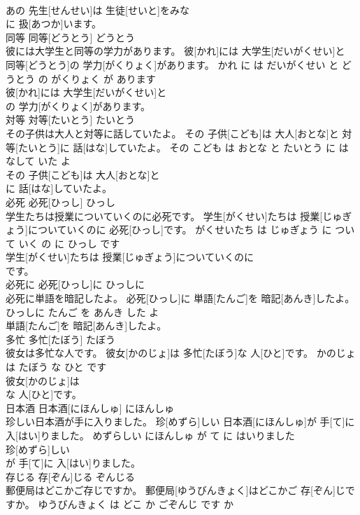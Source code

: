 \documentclass[8pt]{extreport}
\begin{document}
\begin{CJK}{UTF8}{min}
\\	あの 先生[せんせい]は 生徒[せいと]をみな
\\	に 扱[あつか]います。			
\\	同等	同等[どうとう]	どうとう	
\\	彼には大学生と同等の学力があります。	彼[かれ]には 大学生[だいがくせい]と 同等[どうとう]の 学力[がくりょく]があります。	かれ に は だいがくせい と どうとう の がくりょく が あります	
\\	彼[かれ]には 大学生[だいがくせい]と
\\	の 学力[がくりょく]があります。			
\\	対等	対等[たいとう]	たいとう	
\\	その子供は大人と対等に話していたよ。	その 子供[こども]は 大人[おとな]と 対等[たいとう]に 話[はな]していたよ。	その こども は おとな と たいとう に はなして いた よ	
\\	その 子供[こども]は 大人[おとな]と
\\	に 話[はな]していたよ。			
\\	必死	必死[ひっし]	ひっし	
\\	学生たちは授業についていくのに必死です。	学生[がくせい]たちは 授業[じゅぎょう]についていくのに 必死[ひっし]です。	がくせいたち は じゅぎょう に ついて いく の に ひっし です	
\\	学生[がくせい]たちは 授業[じゅぎょう]についていくのに
\\	です。			
\\	必死に	必死[ひっし]に	ひっしに	
\\	必死に単語を暗記したよ。	必死[ひっし]に 単語[たんご]を 暗記[あんき]したよ。	ひっしに たんご を あんき した よ	
\\	単語[たんご]を 暗記[あんき]したよ。			
\\	多忙	多忙[たぼう]	たぼう	
\\	彼女は多忙な人です。	彼女[かのじょ]は 多忙[たぼう]な 人[ひと]です。	かのじょ は たぼう な ひと です	
\\	彼女[かのじょ]は
\\	な 人[ひと]です。			
\\	日本酒	日本酒[にほんしゅ]	にほんしゅ	
\\	珍しい日本酒が手に入りました。	珍[めずら]しい 日本酒[にほんしゅ]が 手[て]に 入[はい]りました。	めずらしい にほんしゅ が て に はいりました	
\\	珍[めずら]しい
\\	が 手[て]に 入[はい]りました。			
\\	存じる	存[ぞん]じる	ぞんじる	
\\	郵便局はどこかご存じですか。	郵便局[ゆうびんきょく]はどこかご 存[ぞん]じですか。	ゆうびんきょく は どこ か ごぞんじ です か	

\end{CJK}
\end{document}
